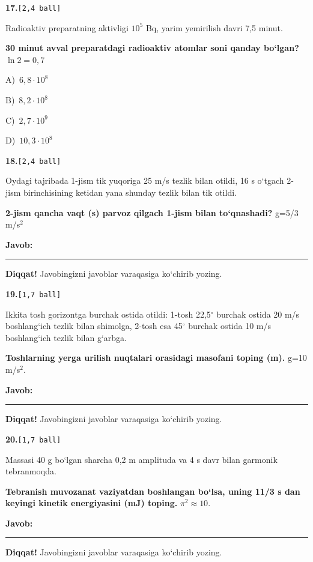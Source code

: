 \documentclass[11pt,a4paper]{article}
\newcommand{\ball}[1]{\hfill\texttt{[#1 ball]}}
\newcommand{\qhead}[2]{\Needspace{10\baselineskip}\noindent\textbf{#1.}\ball{#2}\par\nopagebreak}
\newcommand{\opt}[2]{\hspace*{8mm}#1)\ #2\par}
\newenvironment{qbody}{\begin{list}{}{\leftmargin=8mm\rightmargin=0pt\topsep=0pt\itemsep=0pt\parsep=3pt}\item\relax}{\end{list}}
\begin{document}
\noindent\begin{minipage}{\linewidth}
\qhead{17}{2,4}
\begin{qbody}
Radioaktiv preparatning aktivligi $10^5$ Bq, yarim yemirilish davri 7,5 minut.\par
\textbf{30 minut avval preparatdagi radioaktiv atomlar soni qanday bo‘lgan?} $\ln 2 = 0{,}7$\par
\smallskip
\opt{A}{$6{,}8\cdot10^8$}
\opt{B}{$8{,}2\cdot10^8$}
\opt{C}{$2{,}7\cdot10^9$}
\opt{D}{$10{,}3\cdot10^8$}
\end{qbody}\end{minipage}\par\vspace{16pt}
\qhead{18}{2,4}
\begin{qbody}
Oydagi tajribada 1-jism tik yuqoriga 25 m/s tezlik bilan otildi, 16 s o‘tgach 2-jism birinchisining ketidan yana shunday tezlik bilan tik otildi.\par
\textbf{2-jism qancha vaqt (s) parvoz qilgach 1-jism bilan to‘qnashadi?} g=5/3 m/s$^{2}$\par
\medskip\textbf{Javob:}\ \rule{5cm}{0.4pt}\par
\textbf{Diqqat!} Javobingizni javoblar varaqasiga ko‘chirib yozing.\par
\end{qbody}\vspace{18pt}
\qhead{19}{1,7}
\begin{qbody}
Ikkita tosh gorizontga burchak ostida otildi: 1-tosh 22,5$^\circ$ burchak ostida 20 m/s boshlang‘ich tezlik bilan shimolga, 2-tosh esa 45$^\circ$ burchak ostida 10 m/s boshlang‘ich tezlik bilan g‘arbga.\par
\textbf{Toshlarning yerga urilish nuqtalari orasidagi masofani toping (m).} g=10 m/s$^{2}$.\par
\medskip\textbf{Javob:}\ \rule{5cm}{0.4pt}\par
\textbf{Diqqat!} Javobingizni javoblar varaqasiga ko‘chirib yozing.\par
\end{qbody}\vspace{18pt}
\qhead{20}{1,7}
\begin{qbody}
Massasi 40 g bo‘lgan sharcha 0,2 m amplituda va 4 s davr bilan garmonik tebranmoqda.\par
\textbf{Tebranish muvozanat vaziyatdan boshlangan bo‘lsa, uning 11/3 s dan keyingi kinetik energiyasini (mJ) toping.} $\pi^2 \approx 10$.\par
\medskip\textbf{Javob:}\ \rule{5cm}{0.4pt}\par
\textbf{Diqqat!} Javobingizni javoblar varaqasiga ko‘chirib yozing.\par
\end{qbody}\vspace{18pt}
\end{document}
